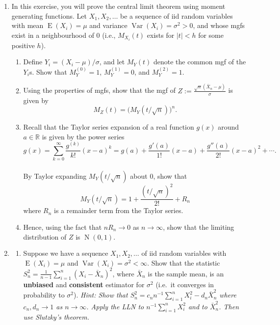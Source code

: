 \documentclass[
]{book}
\DeclareMathOperator{\E}{E}
\DeclareMathOperator{\Var}{Var}
\DeclareMathOperator{\N}{N}
\newcommand{\bbR}{\mathbb{R}}
\theoremstyle{definition}
\theoremstyle{definition}
\theoremstyle{definition}
\theoremstyle{definition}
\theoremstyle{remark}
\begin{document}
\begin{enumerate}
\def\labelenumi{\arabic{enumi}.}
\item
  In this exercise, you will prove the central limit theorem using moment generating functions. Let \(X_1,X_2,\dots\) be a sequence of iid random variables with mean \(\E(X_i)=\mu\) and variance \(\Var(X_i)=\sigma^2>0\), and whose mgfs exist in a neighbourhood of 0 (i.e., \(M_{X_i}(t)\) exists for \(|t|<h\) for some positive \(h\)).

  \begin{enumerate}
  \def\labelenumii{(\alph{enumii})}
  \item
    Define \(Y_i=(X_i-\mu)/\sigma\), and let \(M_Y(t)\) denote the common mgf of the \(Y_i\)s. Show that \(M_Y^{(0)} = 1\), \(M_Y^{(1)} = 0\), and \(M_Y^{(2)} = 1\).
  \item
    Using the properties of mgfs, show that the mgf of \(Z := \frac{\sqrt n(\bar X_n - \mu)}{\sigma}\) is given by
    \begin{equation}\label{eq:clt}
       M_Z(t) = \big(M_Y(t/\sqrt n) \big)^n.
     \end{equation}
  \item
    Recall that the Taylor series expansion of a real function \(g(x)\) around \(a\in\bbR\) is given by the power series
    \[
       g(x) = \sum_{k=0}^\infty \frac{g^{(k)}}{k!}(x-a)^k = g(a) + \frac{g'(a)}{1!}(x-a) + \frac{g''(a)}{2!}(x-a)^2 + \cdots .
     \]\\
    By Taylor expanding \(M_Y(t/\sqrt n)\) about 0, show that
    \[
     M_Y(t/\sqrt n)  = 1 + \frac{(t/\sqrt n)^2}{2!} + R_n
     \]
    where \(R_n\) is a remainder term from the Taylor series.
  \item
    Hence, using the fact that \(nR_n\to 0\) as \(n\to\infty\), show that the limiting distribution of \(Z\) is \(\N(0,1)\).
  \end{enumerate}
\item
  \begin{enumerate}
  \def\labelenumii{(\alph{enumii})}
  \item
    Suppose we have a sequence \(X_1,X_2,\dots\) of iid random variables with \(\E(X_i)=\mu\) and \(\Var(X_i)=\sigma^2<\infty\). Show that the statistic \(S_n^2 = \frac{1}{n-1}\sum_{i=1}^n(X_i-\bar X_n)^2\), where \(\bar X_n\) is the sample mean, is an \textbf{unbiased} and \textbf{consistent} estimator for \(\sigma^2\) (i.e.~it converges in probability to \(\sigma^2\)). \emph{Hint: Show that \(S_n^2 = c_n n^{-1}\sum_{i=1}^n X_i^2 - d_n \bar X_n^2\) where \(c_n,d_n \to 1\) as \(n\to\infty\). Apply the LLN to \(n^{-1}\sum_{i=1}^n X_i^2\) and to \(\bar X_n^2\). Then use Slutzky's theorem.}

\end{enumerate}
\end{enumerate}
\end{document}
